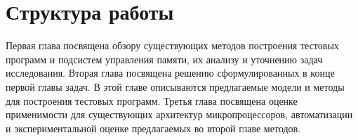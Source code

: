 \documentclass[14pt]{extreport}
\makeatletter
\renewcommand\appendix{\par
  \setcounter{chapter}{0}%
  \setcounter{section}{0}%
  \def\@chapapp{\appendixname}%
  \def\thechapter{\@Asbuk\c@chapter}}
\makeatother
\begin{document}
\section*{Структура работы}
Первая глава посвящена обзору существующих методов построения тестовых программ и подсистем управления памяти, их анализу и уточнению задач исследования. Вторая глава посвящена решению сформулированных в конце первой главы задач. В этой главе описываются предлагаемые модели и методы для построения тестовых программ. Третья глава посвящена оценке применимости для существующих архитектур микропроцессоров, автоматизации и экспериментальной оценке предлагаемых во второй главе методов.










\pagebreak
\appendix
% 





\pagebreak




\end{document}
